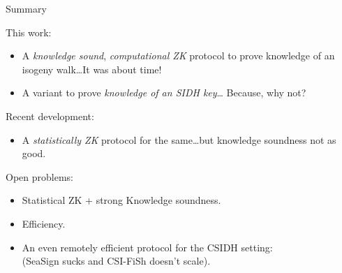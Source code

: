 \documentclass[aspectratio=169]{beamer}
\begin{document}

\begin{frame}{Summary}
  \large
  
  This work:
  \begin{itemize}
  \item A \emph{knowledge sound}, \emph{computational ZK} protocol to
    prove knowledge of an isogeny walk\dots It was about time!
  \item A variant to prove \emph{knowledge of an SIDH key}\dots
    Because, why not?
  \end{itemize}

  \bigskip

  Recent development:
  \begin{itemize}
  \item A \emph{statistically ZK} protocol for the same\dots but
    knowledge soundness not as good.
  \end{itemize}

  \bigskip

  Open problems:
  \begin{itemize}
  \item Statistical ZK + strong Knowledge soundness.
  \item Efficiency.
  \item An even remotely efficient protocol for the CSIDH setting:\\
    (SeaSign sucks and CSI-FiSh doesn't scale).
  \end{itemize}
\end{frame}
\end{document}

